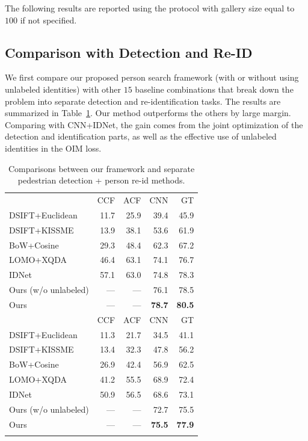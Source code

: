 The following results are reported using the protocol with gallery size equal to $100$ if not specified.

\subsection{Comparison with Detection and Re-ID} %
\label{sub:ps-comparison-with-detection-and-re-id}
We first compare our proposed person search framework (with or without using unlabeled identities) with other $15$ baseline combinations that break down the problem into separate detection and re-identification tasks. The results are summarized in Table~\ref{tab:ps-results}. Our method outperforms the others by large margin. Comparing with CNN+IDNet, the gain comes from the joint optimization of the detection and identification parts, as well as the effective use of unlabeled identities in the OIM loss.

\setlength{\tabcolsep}{8pt}
\begin{table}
\begin{center}
\begin{tabular}{lrrrr}
\hline\noalign{\smallskip}
\noalign{\smallskip}
\multicolumn{1}{c}{CMC top-1 (\%)} & CCF & ACF & CNN & GT \\
\noalign{\smallskip}\hline\hline\noalign{\smallskip}
DSIFT+Euclidean & 11.7 & 25.9 & 39.4 & 45.9 \\
DSIFT+KISSME    & 13.9 & 38.1 & 53.6 & 61.9 \\
BoW+Cosine      & 29.3 & 48.4 & 62.3 & 67.2 \\
LOMO+XQDA       & 46.4 & 63.1 & 74.1 & 76.7 \\
IDNet           & 57.1 & 63.0 & 74.8 & 78.3 \\
\hline\noalign{\smallskip}
Ours (w/o unlabeled)   & --- & --- & 76.1 & 78.5 \\
Ours                   & --- & --- & \textbf{78.7} & \textbf{80.5} \\
\hline\noalign{\smallskip}
\noalign{\smallskip}
\multicolumn{1}{c}{mAP (\%)} & CCF & ACF & CNN & GT \\
\noalign{\smallskip}\hline\hline\noalign{\smallskip}
DSIFT+Euclidean & 11.3 & 21.7 & 34.5 & 41.1 \\
DSIFT+KISSME    & 13.4 & 32.3 & 47.8 & 56.2 \\
BoW+Cosine      & 26.9 & 42.4 & 56.9 & 62.5 \\
LOMO+XQDA       & 41.2 & 55.5 & 68.9 & 72.4 \\
IDNet           & 50.9 & 56.5 & 68.6 & 73.1 \\
\hline\noalign{\smallskip}
Ours (w/o unlabeled)   & --- & --- & 72.7 & 75.5 \\
Ours                   & --- & --- & \textbf{75.5} & \textbf{77.9} \\
\hline\noalign{\smallskip}
\end{tabular}
\end{center}
\caption{Comparisons between our framework and separate pedestrian detection + person re-id methods. }
\label{tab:ps-results}
\end{table}
\setlength{\tabcolsep}{6pt}

